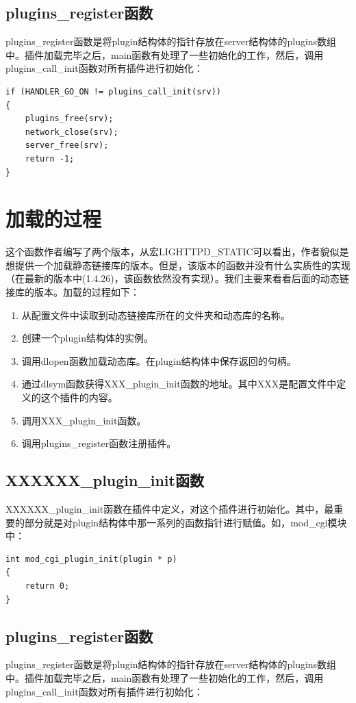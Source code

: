 \documentclass[12pt, dvipdfm]{book}
\begin{document}
\subsection{plugins\_register函数}
plugins\_register函数是将plugin结构体的指针存放在server结构体的plugins数组中。插件加载完毕之后，main函数有处理了一些初始化的工作，然后，调用plugins\_call\_init函数对所有插件进行初始化：

\begin{verbatim}
if (HANDLER_GO_ON != plugins_call_init(srv)) 
{
	plugins_free(srv);
	network_close(srv);
	server_free(srv);
	return -1;
}
\end{verbatim}

\section{加载的过程}
这个函数作者编写了两个版本，从宏LIGHTTPD\_STATIC可以看出，作者貌似是想提供一个加载静态链接库的版本。但是，该版本的函数并没有什么实质性的实现（在最新的版本中(1.4.26)，该函数依然没有实现）。我们主要来看看后面的动态链接库的版本。加载的过程如下：
\begin{enumerate}
	\item 从配置文件中读取到动态链接库所在的文件夹和动态库的名称。
	\item 创建一个plugin结构体的实例。
	\item 调用dlopen函数加载动态库。在plugin结构体中保存返回的句柄。
	\item 通过dlsym函数获得XXX\_plugin\_init函数的地址。其中XXX是配置文件中定义的这个插件的内容。
	\item 调用XXX\_plugin\_init函数。
	\item 调用plugins\_register函数注册插件。
\end{enumerate}

\subsection{XXXXXX\_plugin\_init函数}
XXXXXX\_plugin\_init函数在插件中定义，对这个插件进行初始化。其中，最重要的部分就是对plugin结构体中那一系列的函数指针进行赋值。如，mod\_cgi模块中：

\begin{verbatim}
int mod_cgi_plugin_init(plugin * p)
{
	return 0;
}
\end{verbatim}


\subsection{plugins\_register函数}
plugins\_register函数是将plugin结构体的指针存放在server结构体的plugins数组中。插件加载完毕之后，main函数有处理了一些初始化的工作，然后，调用plugins\_call\_init函数对所有插件进行初始化：
\end{document}
